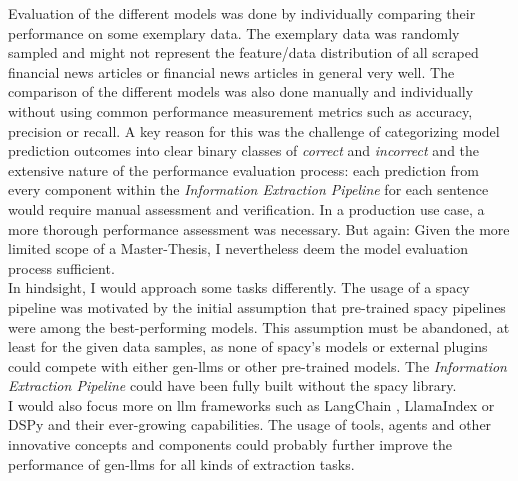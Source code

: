 Evaluation of the different models was done by individually comparing their performance on some exemplary data.
The exemplary data was randomly sampled and might not represent the feature/data distribution of all scraped financial news articles or financial news articles in general very well.
The comparison of the different models was also done manually and individually without using common performance measurement metrics such as accuracy, precision or recall.
A key reason for this was the challenge of categorizing model prediction outcomes into clear binary classes of \emph{correct} and \emph{incorrect}
and the extensive nature of the performance evaluation process: each prediction from every component within the \emph{Information Extraction Pipeline} for each sentence would require manual assessment and verification.
In a production use case, a more thorough performance assessment was necessary.
But again: Given the more limited scope of a Master-Thesis, I nevertheless deem the model evaluation process sufficient.\\


In hindsight, I would approach some tasks differently.
The usage of a spacy pipeline was motivated by the initial assumption that pre-trained spacy pipelines were among the best-performing models.
This assumption must be abandoned, at least for the given data samples, as none of spacy's models or external plugins could compete with either \gls{gen-llm}s or other pre-trained models.
The \emph{Information Extraction Pipeline} could have been fully built without the spacy library.\\

I would also focus more on \gls{llm} frameworks such as LangChain \cite{LangChain}, LlamaIndex \cite{llamaindex} or DSPy \cite{dspy} and their ever-growing capabilities.
The usage of tools, agents and other innovative concepts and components could probably further improve the performance of \gls{gen-llm}s for all kinds of extraction tasks.\\






